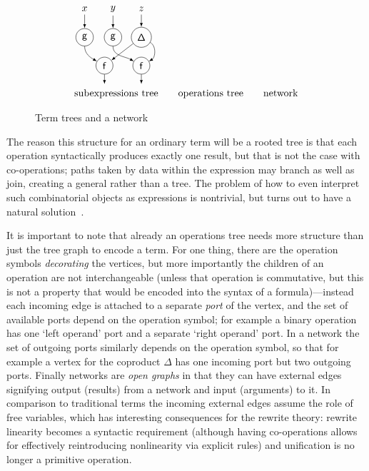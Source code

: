 \documentclass{article}
\theoremstyle{definition}
\begin{document}
\begin{figure}
\[\begin{tabular}{c@{\qquad}c@{\qquad}c}
      \begin{tikzpicture}[>=latex]
        \node (r1c1) at (0,2) {$x$};
        \node (r1c2) at (1,2) {$y$};
        \node (r1c3) at (2,2) {$z$};
        \node[draw,circle] (r2c1) at (0,1) {$\mathsf{g}$};
        \node[draw,circle] (r2c2) at (1,1) {$\mathsf{g}$};
        \node[draw,circle] (r2c3) at (2,1) {$\mathsf{\Delta}$};
        \node[draw,circle] (r3c2) at (0.7,0) {$\mathsf{f}$};
        \node[draw,circle] (r3c3) at (2,0) {$\mathsf{f}$};
        \draw[->] (r1c1) -- (r2c1);
        \draw[->] (r1c2) -- (r2c2);
        \draw[->] (r1c3) -- (r2c3);
        \draw[->] (r2c1) to[out=-90,in=150] (r3c2);
        \draw[->] (r2c2) to[out=-90,in=150] (r3c3);
        \draw[->] (r2c3) -- (r3c2);
        \draw[->] (r2c3) to[out=-30,in=30] (r3c3);
        \draw[->] (r3c2) -- ++(0,-0.65);
        \draw[->] (r3c3) -- ++(0,-0.65);
      \end{tikzpicture}%
      \\
      subexpressions tree& operations tree& 
      network
    \end{tabular}
  \]
  \caption{Term trees and a network}
  \label{Fig:TermTrees&network}
\end{figure}
The reason this structure for an ordinary term will be a rooted tree 
is that each operation syntactically produces exactly one result, but 
that is not the case with co-operations; paths taken by data within 
the expression may branch as well as join, creating a general 
 rather than a tree. The problem of how to even 
interpret such combinatorial objects as expressions is nontrivial, 
but turns out to have a natural solution~\cite[Sec.~5]{NR1}.

It is important to note that already an operations tree needs more 
structure than just the tree graph to encode a term. For one thing, 
there are the operation symbols \emph{decorating} the vertices, but 
more importantly the children of an operation are not interchangeable 
(unless that operation is commutative, but this is not a property 
that would be encoded into the syntax of a formula)---instead each 
incoming edge is attached to a separate \emph{port} of the vertex, 
and the set of available ports depend on the operation symbol; for 
example a binary operation has one `left operand' port and a 
separate `right operand' port. In a network the set of outgoing ports 
similarly depends on the operation symbol, so that for example a 
vertex for the coproduct $\mathsf{\Delta}$ has one incoming port but 
two outgoing ports. Finally networks are \emph{open graphs} in that 
they can have external edges signifying output (results) from a 
network and input (arguments) to it. In comparison to traditional 
terms the incoming external edges assume the role of free variables, 
which has interesting consequences for the rewrite theory: rewrite 
linearity becomes a syntactic requirement (although having 
co-operations allows for effectively reintroducing nonlinearity via 
explicit rules) and unification is no longer a primitive operation.
\end{document}
